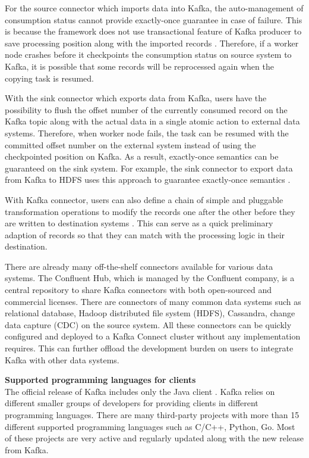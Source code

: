 For the source connector which imports data into Kafka, the auto-management of consumption status cannot provide exactly-once guarantee in case of failure. This is because the framework does not use transactional feature of Kafka producer to save processing position along with the imported records \cite{kafkaconnectsource}. Therefore, if a worker node crashes before it checkpoints the consumption status on source system to Kafka, it is possible that some records will be reprocessed again when the copying task is resumed. 

With the sink connector which exports data from Kafka, users have the possibility to flush the offset number of the currently consumed record on the Kafka topic along with the actual data in a single atomic action to external data systems. Therefore, when worker node fails, the task can be resumed with the committed offset number on the external system instead of using the checkpointed position on Kafka. As a result, exactly-once semantics can be guaranteed on the sink system. For example, the sink connector to export data from Kafka to HDFS uses this approach to guarantee exactly-once semantics \cite{kafkahdfsconnector}.


With Kafka connector, users can also define a chain of simple and pluggable transformation operations to modify the records one after the other before they are written to destination systems \cite{kafkaconnect}. This can serve as a quick preliminary adaption of records so that they can match with the processing logic in their destination.

There are already many off-the-shelf connectors available for various data systems. The Confluent Hub, which is managed by the Confluent company, is a central repository to share Kafka connectors with both open-sourced and commercial licenses. There are connectors of many common data systems such as relational database, Hadoop distributed file system (HDFS), Cassandra, change data capture (CDC) on the source system. All these connectors can be quickly configured and deployed to a Kafka Connect cluster without any implementation requires. This can further offload the development burden on users to integrate Kafka with other data systems.

\newpage

\textbf{Supported programming languages for clients}\\
The official release of Kafka includes only the Java client \cite{kafkaclients}. Kafka relies on different smaller groups of developers for providing clients in different programming languages. There are many third-party projects with more than 15 different supported programming languages such as C/C++, Python, Go. Most of these projects are very active and regularly updated along with the new release from Kafka.  

